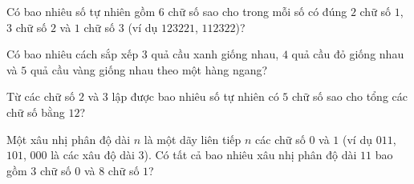 \begin{vd}%
Có bao nhiêu số tự nhiên gồm $6$ chữ số sao cho trong mỗi số có đúng $2$ chữ số $1$, $3$ chữ số $2$  và $1$ chữ số $3$ (ví dụ $123221$, $112322$)?
\end{vd}

\begin{vd}%
Có bao nhiêu cách sắp xếp $3$ quả cầu xanh giống nhau, $4$ quả cầu đỏ giống nhau và $5$ quả cầu vàng giống nhau theo một hàng ngang?
\end{vd}

\begin{vd}%
Từ các chữ số $2$ và $3$ lập được bao nhiêu số tự nhiên có $5$ chữ số sao cho tổng các chữ số bằng $12$?
\end{vd}

\begin{vd}%
Một xâu nhị phân độ dài $n$ là một dãy liên tiếp $n$ các chữ số $0$  và $1$ (ví dụ $011$, $101$, $000$ là các xâu độ dài $3$). Có tất cả bao nhiêu xâu nhị phân độ dài $11$ bao gồm  $3$  chữ số $0$  và  $8$ chữ số $1$?
\end{vd}


